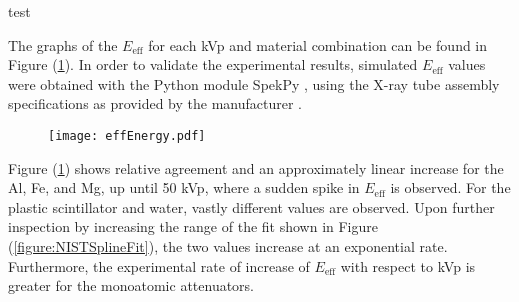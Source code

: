 %     

%     

%     




%     

%     

\begin{table}[H]
    \small
    \noindent\makebox[\textwidth]{%
    
    }
    \caption{test}
    \label{table::results}
\end{table}



The graphs of the $E_{\text{eff}}$ for each kVp and material combination can be found in Figure (\ref{figure::results}). In order to validate the experimental results, simulated $E_{\text{eff}}$ values were obtained with the Python module SpekPy \cite{SpekPy}, using the X-ray tube assembly specifications as provided by the manufacturer \cite{CArm}.


\begin{figure}[H]
    \centering
    \texttt{[image: effEnergy.pdf]}
    \caption{}
    \label{figure::results}
\end{figure}

Figure (\ref{figure::results}) shows relative agreement and an approximately linear increase for the Al, Fe, and Mg, up until 50 kVp, where a sudden spike in $E_{\text{eff}}$ is observed. For the plastic scintillator and water, vastly different values are observed. Upon further inspection by increasing the range of the fit shown in Figure (\ref{figure:NISTSplineFit}), the two values increase at an exponential rate. Furthermore, the experimental rate of increase of $E_{\text{eff}}$ with respect to kVp is greater for the monoatomic attenuators.

